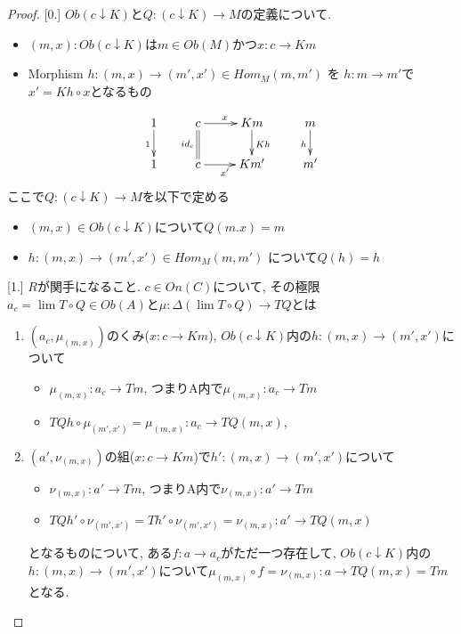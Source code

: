 \documentclass[dvipdfmx,a4paper,11pt]{report}
\theoremstyle{definition}
\begin{document}
\begin{proof}

[0.]
$Ob(c \downarrow K)$と$Q: (c \downarrow K) \to M $の定義について.

\begin{itemize}
\item $(m,x) : Ob(c \downarrow K)$は$m \in Ob(M)$かつ$x : c \to Km$ %
\item Morphism $h : (m,x)  \to (m',x') \in Hom_{M}(m,m') $ を 
$h: m \to m'$で$x'  = Kh \circ x$となるもの
\end{itemize}

\begin{equation*}
\xymatrix@C=25pt@R=20pt{
1 \ar@{->}[d] _{1}&c \ar@{=}[d]_{id_c}  \ar@{->}[r]^{x} & Km\ar@{->}[d]^{Kh} &m\ar@{->}[d]_{h}\\
1&c\ar@{->}[r]_{x'} &Km'&m' \\   
}
\end{equation*}
ここで$Q: (c \downarrow K) \to M $を以下で定める
\begin{itemize}
\item $(m,x) \in Ob(c \downarrow K )$について$Q(m.x) = m$
\item $h : (m,x)  \to (m',x') \in Hom_{M}(m,m') $ について$Q(h) =h$
\end{itemize}

[1.] $R$が関手になること.
$c \in On(C)$について, その極限$a_c =\lim T\circ Q \in Ob(A)$と$\mu: \Delta (\lim T\circ Q) \to TQ$とは
\begin{enumerate}
\item $(a_c , \mu_{(m,x)})$のくみ($x : c \to Km $), $Ob(c \downarrow K )$内の$h : (m,x)\to (m',x')$について
\begin{itemize}
\item $\mu_{(m,x)} : a_c \to Tm  $, つまりA内で$\mu_{(m,x)} :  a_c  \to Tm $
\item $ TQ h  \circ \mu_{(m',x')} = \mu_{(m,x)} :a_c \to  TQ(m,x) $, 
\end{itemize}
\item $(a' , \nu_{(m,x)})$の組($x : c \to Km $)で$h' : (m,x)\to (m',x')$について
\begin{itemize}
\item $\nu_{(m,x)} :  a' \to Tm $, つまりA内で$\nu_{(m,x)} : a' \to Tm $
\item $  TQ h' \circ \nu_{(m',x')}=Th' \circ \nu_{(m',x')}=\nu_{(m,x)} :a '  \to  TQ(m,x) $
\end{itemize}
となるものについて, ある$f : a \to a_c$がただ一つ存在して,  $Ob(c \downarrow K )$内の$h : (m,x)\to (m',x')$について$\mu_{(m,x)} \circ f = \nu_{(m,x)}: a \to TQ(m,x)=Tm$となる.
\end{enumerate}


\end{proof}
\end{document}
